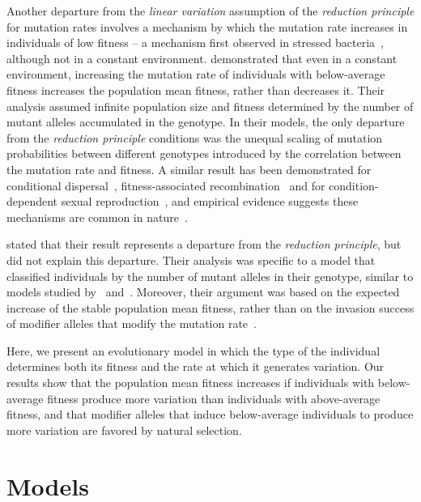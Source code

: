 \documentclass[12pt, twocolumn]{extarticle}
\begin{document}
Another departure from the \emph{linear variation} assumption of the \emph{reduction principle} for mutation rates involves a mechanism by which the mutation rate increases in individuals of low fitness -- a mechanism first observed in stressed bacteria~\citep{Foster2007}, although not in a constant environment.
\citet{Ram2012} demonstrated that even in a constant environment, increasing the mutation rate of individuals with below-average fitness increases the population mean fitness, rather than decreases it.
Their analysis assumed  infinite population size and fitness  determined by the number of mutant alleles accumulated in the genotype.
In their models, the only departure from the \emph{reduction principle} conditions was the unequal scaling of mutation probabilities between different genotypes introduced by the correlation between the mutation rate and fitness.
A similar result has been demonstrated for conditional dispersal~\citep[Th.~39]{Altenberg2012b}, fitness-associated recombination~\citep{Hadany2003a} and for condition-dependent sexual reproduction~\citep{Hadany2007a}, and empirical evidence suggests these mechanisms are common in nature~\citep{Ram2016}.

\citet{Ram2012} stated that their result represents a departure from the \emph{reduction principle}, but did not explain this departure.
Their analysis was specific to a model that classified individuals by the number of mutant alleles in their genotype, similar to models studied by~\citet{Kimura1966a} and~\citet{Haigh1978}.
Moreover, their argument was based on the expected increase of the stable population mean fitness, rather than on the invasion success of modifier alleles that modify the mutation rate~\citep[i.e., analysis of \emph{evolutionary genetic stability}, see][]{Eshel1982, Lessard1990}.

Here, we present an evolutionary model in which the type of the individual determines both its fitness and the rate at which it generates variation.
Our results show that the population mean fitness increases if individuals with below-average fitness produce more variation than individuals with above-average fitness,
and that modifier alleles that induce below-average individuals to produce more variation are favored by natural selection.

\section*{Models}\label{sec:models}
\end{document}

